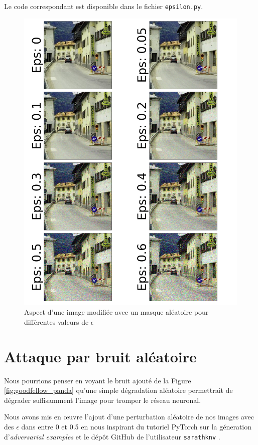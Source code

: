 \documentclass[10pt,twocolumn,letterpaper]{article}
\begin{document}
Le code correspondant est disponible dans le fichier \texttt{epsilon.py}.

\begin{figure}[!ht]
\begin{center}
\includegraphics[width=0.9\linewidth]{ressources/epsilon.png}
\end{center}
   \caption{Aspect d'une image modifiée avec un masque aléatoire pour différentes valeurs de $\epsilon$}
\label{fig:diff_epsilon}
\end{figure}

\section{Attaque par bruit aléatoire}

Nous pourrions penser en voyant le bruit ajouté de la Figure \ref{fig:goodfellow_panda} qu'une simple dégradation aléatoire permettrait de dégrader suffisamment l'image pour tromper le réseau neuronal.

Nous avons mis en œuvre l'ajout d'une perturbation aléatoire de nos images avec des $\epsilon$ dans entre 0 et 0.5 en nous inspirant du tutoriel PyTorch sur la géneration d'\textit{adversarial examples} et le dépôt GitHub de l'utilisateur \texttt{sarathknv} \cite{sarath2018}.
\end{document}

